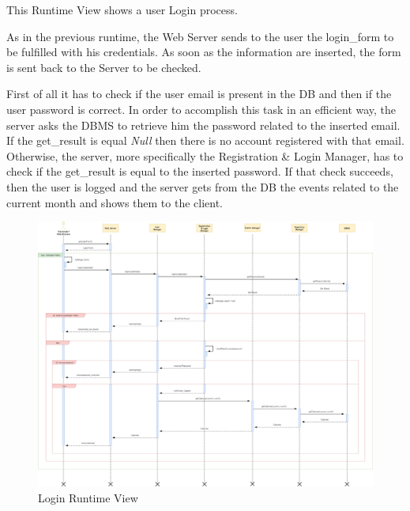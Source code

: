 This Runtime View shows a user Login process.\par
As in the previous runtime, the Web Server sends to the user the login\_form to be fulfilled with his credentials. As soon as the information are inserted, the form is sent back to the Server to be checked.\par
First of all it has to check if the user email is present in the DB and then if the user password is correct. In order to accomplish this task in an efficient way, the server asks the DBMS to retrieve him the password related to the inserted email. If the get\_result is equal \emph{Null} then there is no account registered with that email. Otherwise, the server, more specifically the Registration \& Login Manager, has to check if the get\_result is equal to the inserted password.
If that check succeeds, then the user is logged and the server gets from the DB the events related to the current month and shows them to the client.
\begin{figure}[H]
	\centering
	\includegraphics[scale=0.17]{Images/Runtime/Login}
	\caption{Login Runtime View}
\end{figure}

